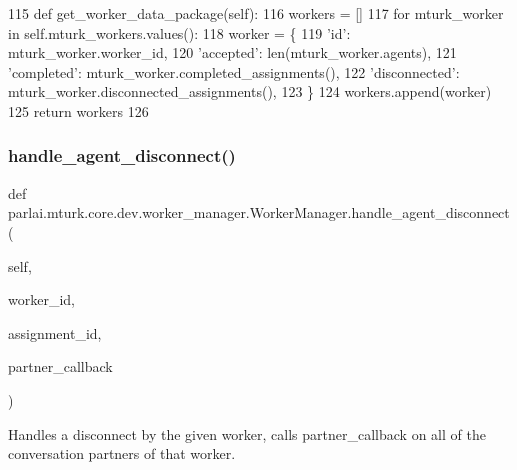 \begin{DoxyCode}
115     \textcolor{keyword}{def }get\_worker\_data\_package(self):
116         workers = []
117         \textcolor{keywordflow}{for} mturk\_worker \textcolor{keywordflow}{in} self.mturk\_workers.values():
118             worker = \{
119                 \textcolor{stringliteral}{'id'}: mturk\_worker.worker\_id,
120                 \textcolor{stringliteral}{'accepted'}: len(mturk\_worker.agents),
121                 \textcolor{stringliteral}{'completed'}: mturk\_worker.completed\_assignments(),
122                 \textcolor{stringliteral}{'disconnected'}: mturk\_worker.disconnected\_assignments(),
123             \}
124             workers.append(worker)
125         \textcolor{keywordflow}{return} workers
126 
\end{DoxyCode}
\mbox{\label{classparlai_1_1mturk_1_1core_1_1dev_1_1worker__manager_1_1WorkerManager_aaeb48ce35a7793d501d2a317ea225526}} 
\subsubsection{\texorpdfstring{handle\+\_\+agent\+\_\+disconnect()}{handle\_agent\_disconnect()}}
{\footnotesize\ttfamily def parlai.\+mturk.\+core.\+dev.\+worker\+\_\+manager.\+Worker\+Manager.\+handle\+\_\+agent\+\_\+disconnect (\begin{DoxyParamCaption}\item[{}]{self,  }\item[{}]{worker\+\_\+id,  }\item[{}]{assignment\+\_\+id,  }\item[{}]{partner\+\_\+callback }\end{DoxyParamCaption})}

\begin{DoxyVerb}Handles a disconnect by the given worker, calls partner_callback on all of the
conversation partners of that worker.
\end{DoxyVerb}
 

